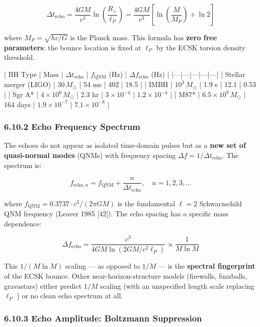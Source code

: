 \documentclass[11pt,a4paper]{article}
\theoremstyle{definition}
\theoremstyle{remark}
\begin{document}
\begin{equation}
\Delta t_{\text{echo}} = \frac{4GM}{c^3} \ln\!\left(\frac{R_+}{\ell_P}\right) = \frac{4GM}{c^3}\left[\ln\!\left(\frac{M}{M_P}\right) + \ln 2\right]
\end{equation}


where $M_P = \sqrt{\hbar c / G}$ is the Planck mass. This formula has \textbf{zero free parameters}: the bounce location is fixed at $\ell_P$ by the ECSK torsion density threshold.

| BH Type | Mass | $\Delta t_{\text{echo}}$ | $f_{\text{QNM}}$ (Hz) | $\Delta f_{\text{echo}}$ (Hz) |
|---|---|---|---|---|
| Stellar merger (LIGO) | $30 \, M_\odot$ | 54 ms | 402 | 18.5 |
| IMBH | $10^3 \, M_\odot$ | 1.9 s | 12.1 | 0.53 |
| Sgr A* | $4 \times 10^6 \, M_\odot$ | 2.3 hr | $3 \times 10^{-4}$ | $1.2 \times 10^{-4}$ |
| M87* | $6.5 \times 10^9 \, M_\odot$ | 164 days | $1.9 \times 10^{-7}$ | $7.1 \times 10^{-8}$ |

\subsubsection{6.10.2 Echo Frequency Spectrum}

The echoes do not appear as isolated time-domain pulses but as a \textbf{new set of quasi-normal modes} (QNMs) with frequency spacing $\Delta f = 1/\Delta t_{\text{echo}}$. The spectrum is:


\begin{equation}
f_{\text{echo},n} = f_{\text{QNM}} + \frac{n}{\Delta t_{\text{echo}}}, \quad n = 1, 2, 3, \ldots
\end{equation}


where $f_{\text{QNM}} = 0.3737 \cdot c^3/(2\pi G M)$ is the fundamental $\ell = 2$ Schwarzschild QNM frequency (Leaver 1985 [42]). The echo spacing has a specific mass dependence:


\begin{equation}
\Delta f_{\text{echo}} = \frac{c^3}{4GM \ln(2GM / c^2 \ell_P)} \propto \frac{1}{M \ln M}
\end{equation}


This $1/(M \ln M)$ scaling — as opposed to $1/M$ — is the \textbf{spectral fingerprint} of the ECSK bounce. Other near-horizon-structure models (firewalls, fuzzballs, gravastars) either predict $1/M$ scaling (with an unspecified length scale replacing $\ell_P$ ) or no clean echo spectrum at all.

\subsubsection{6.10.3 Echo Amplitude: Boltzmann Suppression}
\end{document}

